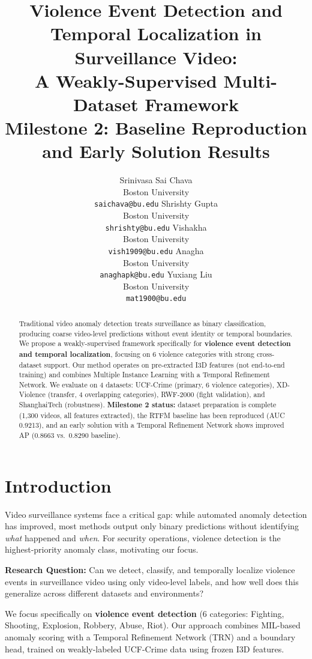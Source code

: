 \documentclass[11pt]{article}
\title{Violence Event Detection and Temporal Localization in Surveillance Video: \\
A Weakly-Supervised Multi-Dataset Framework \\
{\large Milestone 2: Baseline Reproduction and Early Solution Results}}
\author{
  Srinivasa Sai Chava \\
  Boston University \\
  \texttt{saichava@bu.edu}
  \And
  Shrishty Gupta \\
  Boston University \\
  \texttt{shrishty@bu.edu}
  \And
  Vishakha \\
  Boston University \\
  \texttt{vish1909@bu.edu}
  \AND
  Anagha \\
  Boston University \\
  \texttt{anaghapk@bu.edu}
  \And
  Yuxiang Liu \\
  Boston University \\
  \texttt{mat1900@bu.edu}
}
\begin{document}
\maketitle

\begin{abstract}
Traditional video anomaly detection treats surveillance as binary classification,
producing coarse video-level predictions without event identity or temporal boundaries.
We propose a weakly-supervised framework specifically for
\textbf{violence event detection and temporal localization}, focusing on 6 violence
categories with strong cross-dataset support.
Our method operates on pre-extracted I3D features (not end-to-end training) and
combines Multiple Instance Learning with a Temporal Refinement Network.
We evaluate on 4 datasets: UCF-Crime (primary, 6 violence categories),
XD-Violence (transfer, 4 overlapping categories),
RWF-2000 (fight validation), and ShanghaiTech (robustness).
\textbf{Milestone 2 status:} dataset preparation is complete (1,300 videos,
all features extracted), the RTFM baseline has been reproduced (AUC\,0.9213),
and an early solution with a Temporal Refinement Network shows improved AP
(0.8663 vs.\ 0.8290 baseline).
\end{abstract}

\section{Introduction}

Video surveillance systems face a critical gap: while automated anomaly detection
has improved, most methods output only binary predictions without identifying
\textit{what} happened and \textit{when}.
For security operations, violence detection is the highest-priority anomaly class,
motivating our focus.

\textbf{Research Question:}
Can we detect, classify, and temporally localize violence events in surveillance
video using only video-level labels, and how well does this generalize across
different datasets and environments?

We focus specifically on \textbf{violence event detection}
(6 categories: Fighting, Shooting, Explosion, Robbery, Abuse, Riot).
Our approach combines MIL-based anomaly scoring with a Temporal Refinement Network
(TRN) and a boundary head, trained on weakly-labeled UCF-Crime data using frozen
I3D features.
\end{document}
